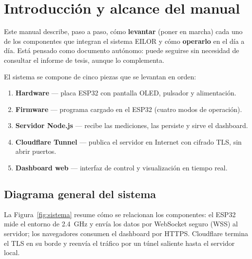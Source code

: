 \documentclass[12pt,a4paper,oneside]{report}
\begin{document}
\hypersetup{pageanchor=true}
\renewcommand{\contentsname}{\color{facetnavy}Contenido}
\tableofcontents
\clearpage
{}

\chapter{Introducción y alcance del manual}
\label{cap:intro}

Este manual describe, paso a paso, cómo \textbf{levantar} (poner en marcha) cada uno
de los componentes que integran el sistema EILOR y cómo \textbf{operarlo} en el día
a día. Está pensado como documento autónomo: puede seguirse sin necesidad de
consultar el informe de tesis, aunque lo complementa.

El sistema se compone de cinco piezas que se levantan en orden:

\begin{enumerate}[leftmargin=1.9em]
  \item \textbf{Hardware} --- placa ESP32 con pantalla OLED, pulsador y alimentación.
  \item \textbf{Firmware} --- programa cargado en el ESP32 (cuatro modos de operación).
  \item \textbf{Servidor Node.js} --- recibe las mediciones, las persiste y sirve el dashboard.
  \item \textbf{Cloudflare Tunnel} --- publica el servidor en Internet con cifrado TLS, sin abrir puertos.
  \item \textbf{Dashboard web} --- interfaz de control y visualización en tiempo real.
\end{enumerate}

\section{Diagrama general del sistema}
La Figura~\ref{fig:sistema} resume cómo se relacionan los componentes: el ESP32
mide el entorno de 2.4~GHz y envía los datos por WebSocket seguro (WSS) al servidor;
los navegadores consumen el dashboard por HTTPS. Cloudflare termina el TLS en su
borde y reenvía el tráfico por un túnel saliente hasta el servidor local.
\end{document}
